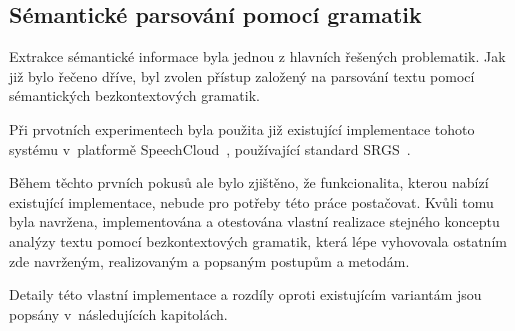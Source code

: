 \subsection{Sémantické parsování pomocí gramatik}\label{subsec:moje_gramatiky}
Extrakce sémantické informace byla jednou z hlavních řešených problematik.
Jak již bylo řečeno dříve, byl zvolen přístup založený na parsování textu pomocí sémantických bezkontextových gramatik.

Při prvotních experimentech byla použita již existující implementace tohoto systému v~platformě SpeechCloud~\cite{SpeechCloud.dialog}, používající standard SRGS~\cite{srgs}.

Během těchto prvních pokusů ale bylo zjištěno, že funkcionalita, kterou nabízí existující implementace,
nebude pro potřeby této práce postačovat.
Kvůli tomu byla navržena, implementována a otestována vlastní realizace stejného konceptu
analýzy textu pomocí bezkontextových gramatik, která lépe vyhovovala ostatním zde navrženým,
realizovaným a popsaným postupům a metodám.

Detaily této vlastní implementace a rozdíly oproti existujícím variantám jsou popsány v~následujících kapitolách.

